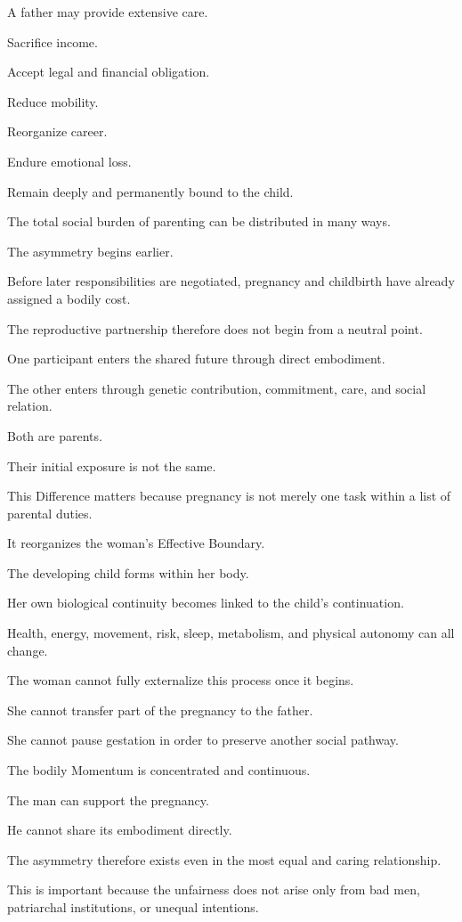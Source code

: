 A father may provide extensive care.

Sacrifice income.

Accept legal and financial obligation.

Reduce mobility.

Reorganize career.

Endure emotional loss.

Remain deeply and permanently bound to the child.

The total social burden of parenting can be distributed in many ways.

The asymmetry begins earlier.

Before later responsibilities are negotiated, pregnancy and childbirth have already assigned a bodily cost.

The reproductive partnership therefore does not begin from a neutral point.

One participant enters the shared future through direct embodiment.

The other enters through genetic contribution, commitment, care, and social relation.

Both are parents.

Their initial exposure is not the same.

This Difference matters because pregnancy is not merely one task within a list of parental duties.

It reorganizes the woman’s Effective Boundary.

The developing child forms within her body.

Her own biological continuity becomes linked to the child’s continuation.

Health, energy, movement, risk, sleep, metabolism, and physical autonomy can all change.

The woman cannot fully externalize this process once it begins.

She cannot transfer part of the pregnancy to the father.

She cannot pause gestation in order to preserve another social pathway.

The bodily Momentum is concentrated and continuous.

The man can support the pregnancy.

He cannot share its embodiment directly.

The asymmetry therefore exists even in the most equal and caring relationship.

This is important because the unfairness does not arise only from bad men, patriarchal institutions, or unequal intentions.

